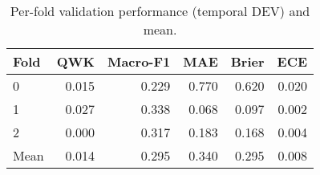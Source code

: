 \begin{table}
\caption{Per-fold validation performance (temporal DEV) and mean.}
\label{tab:cv-performance}
\begin{tabular}{lrrrrr}
\toprule
Fold & QWK & Macro-F1 & MAE & Brier & ECE \\
\midrule
0 & 0.015 & 0.229 & 0.770 & 0.620 & 0.020 \\
1 & 0.027 & 0.338 & 0.068 & 0.097 & 0.002 \\
2 & 0.000 & 0.317 & 0.183 & 0.168 & 0.004 \\
Mean & 0.014 & 0.295 & 0.340 & 0.295 & 0.008 \\
\bottomrule
\end{tabular}
\end{table}
